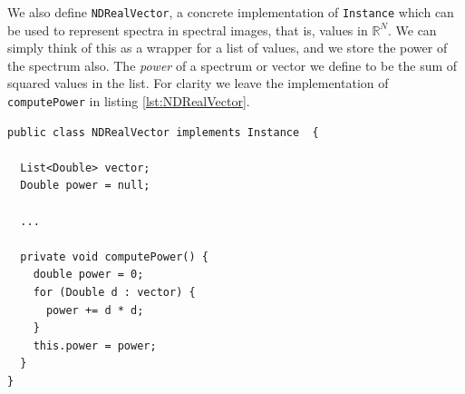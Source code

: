 \documentclass[12pt,twoside,notitlepage]{report}
\newcommand{\bb}[1]{\mathbb{#1}}
\begin{document}
                We also define \texttt{NDRealVector}, a concrete implementation of \texttt{Instance} which can be used 
                to represent spectra in spectral images, that is, values in $\bb{R}^N$. We can simply think of this as 
                a wrapper for a list of values, and we store the power of the spectrum also. The \textit{power} of a 
                spectrum or vector we define to be the sum of squared values in the list. For clarity we leave the implementation 
                of \texttt{computePower} in listing \ref{lst:NDRealVector}.


                \begin{lstlisting}[caption={The \texttt{NDVector} class, a concrete implementation of \texttt{Instance}.}, label={lst:NDRealVector}]
public class NDRealVector implements Instance  {
  
  List<Double> vector;
  Double power = null;

  ...

  private void computePower() {
    double power = 0;
    for (Double d : vector) {
      power += d * d;
    }
    this.power = power;
  }
}
                \end{lstlisting}
\end{document}
